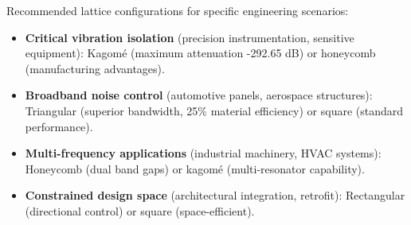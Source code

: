\documentclass[review,numbers,sort&compress]{elsarticle}
\begin{document}
Recommended lattice configurations for specific engineering scenarios:

\begin{itemize}
    \item \textbf{Critical vibration isolation} (precision instrumentation, sensitive equipment): Kagomé (maximum attenuation -292.65 dB) or honeycomb (manufacturing advantages).

    \item \textbf{Broadband noise control} (automotive panels, aerospace structures): Triangular (superior bandwidth, 25\% material efficiency) or square (standard performance).

    \item \textbf{Multi-frequency applications} (industrial machinery, HVAC systems): Honeycomb (dual band gaps) or kagomé (multi-resonator capability).

    \item \textbf{Constrained design space} (architectural integration, retrofit): Rectangular (directional control) or square (space-efficient).
\end{itemize}

\newpage

\end{document}
